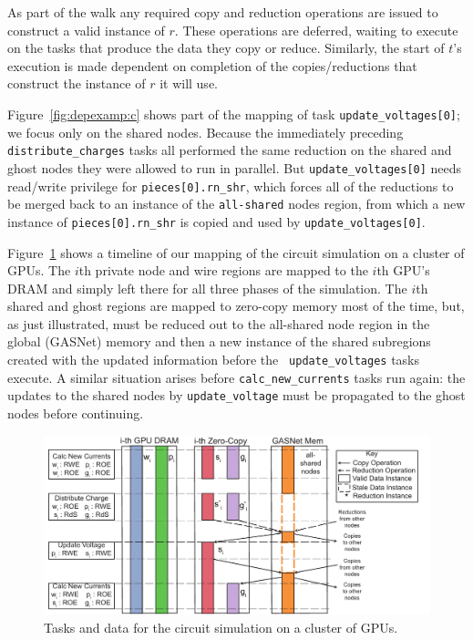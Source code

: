 As part of the walk any required copy and reduction operations are
issued to construct a valid instance of $r$.  These operations are
deferred, waiting to execute on the tasks that produce the data they
copy or reduce. Similarly, the start of $t$'s execution is made
dependent on completion of the copies/reductions that construct the
instance of $r$ it will use.

Figure~\ref{fig:depexamp:c} shows part of the mapping of task {\tt update\_voltages[0]}; we focus
only on the shared nodes.
Because the immediately preceding {\tt distribute\_charges} tasks all performed the same reduction
on the shared and ghost nodes they were allowed to run in parallel.  But {\tt update\_voltages[0]}
needs read/write privilege for {\tt pieces[0].rn\_shr}, which forces all of the reductions to be merged
back to an instance of the {\tt all-shared} nodes region, from which a new instance of {\tt pieces[0].rn\_shr} is copied and used by {\tt update\_voltages[0]}.

Figure~\ref{fig:gpumapping} shows a timeline of our mapping of the
circuit simulation on a cluster of GPUs.  The $i$th private node and
wire regions are mapped to the $i$th GPU's DRAM and simply left there
for all three phases of the simulation.  The $i$th shared and ghost
regions are mapped to zero-copy memory most of the time, but, as just
illustrated, must be reduced out to the all-shared node region in the
global (GASNet) memory and then a new instance of the shared
subregions created with the updated information before the {\tt
  update\_voltages} tasks execute.  A similar situation arises before
{\tt calc\_new\_currents} tasks run again: the updates to the shared
nodes by {\tt update\_voltage} must be propagated to the ghost nodes
before continuing.

\begin{figure}
\includegraphics[scale=0.48]{figs/CircuitMem.pdf}
\caption{Tasks and data for the circuit simulation on a cluster of GPUs.}
\label{fig:gpumapping}
\end{figure}

